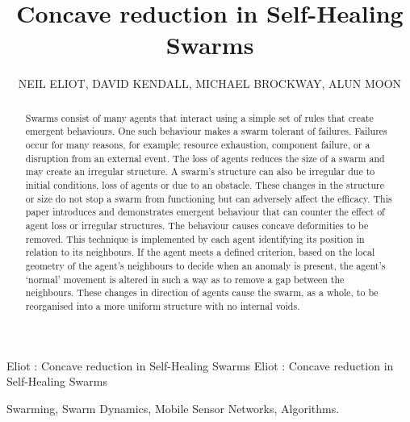 \documentclass{ieeeaccess}
\begin{document}
\title{Concave reduction in Self-Healing Swarms}
\author{\uppercase{Neil Eliot},
\uppercase{David Kendall, Michael Brockway, Alun Moon}}
\address[1]{Northumbria University, Department of Computing and Information Sciences, Newcastle upon Tyne, NE1 8ST}
\markboth
{Eliot \headeretal: Concave reduction in Self-Healing Swarms}
{Eliot \headeretal: Concave reduction in Self-Healing Swarms}

\begin{abstract}
Swarms consist of many agents that interact using a simple set of rules that create emergent behaviours. One such behaviour makes a swarm tolerant of failures. Failures occur for many reasons, for example; resource exhaustion, component failure, or a disruption from an external event. The loss of agents reduces the size of a swarm and may create an irregular structure. A swarm's structure can also be irregular due to initial conditions, loss of agents or due to an obstacle. These changes in the structure or size do not stop a swarm from functioning but can adversely affect the efficacy. This paper introduces and demonstrates emergent behaviour that can counter the effect of agent loss or irregular structures. The behaviour causes concave deformities to be removed. This technique is implemented by each agent identifying its position in relation to its neighbours. If the agent meets a defined criterion, based on the local geometry of the agent's neighbours to decide when an anomaly is present, the agent's `normal' movement is altered in such a way as to remove a gap between the neighbours. These changes in direction of agents cause the swarm, as a whole, to be reorganised into a more uniform structure with no internal voids.
\end{abstract}
\begin{IEEEkeywords}
Swarming, Swarm Dynamics, Mobile Sensor Networks, Algorithms.
\end{IEEEkeywords}
\end{document}
